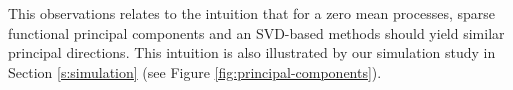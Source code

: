 \documentclass[preprint]{imsart}
\numberwithin{equation}{section}
\theoremstyle{plain}
\begin{document}
This observations relates to the intuition that for a zero mean processes, sparse functional principal components and an SVD-based methods should yield similar principal directions. This intuition is also illustrated by our simulation study in Section \ref{s:simulation} (see Figure \ref{fig:principal-components}).





\end{document}
